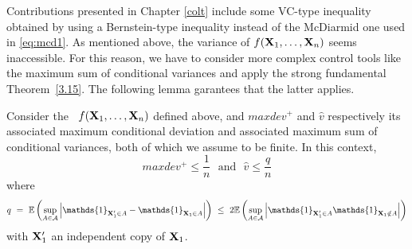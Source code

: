 Contributions presented in Chapter \ref{colt} include some VC-type inequality obtained by using a Bernstein-type inequality instead of the McDiarmid one used in \eqref{eq:mcd1}. As mentioned above, the variance of $f(\mathbf X_1,\ldots,\mathbf X_n)$ seems inaccessible. For this reason, we have to consider more complex control tools like the maximum sum of conditional variances and apply the strong fundamental Theorem~\ref{3.15}. The following lemma garantees that the latter applies.
\begin{lemma}
\label{back:lem-1}
Consider the \rv~$f(\mathbf X_1,\ldots,\mathbf X_n)$ defined above, and $maxdev^+$ and $\hat v$ respectively its associated maximum conditional deviation and associated maximum sum of conditional variances, both of which we assume to be finite. In this context,
$$maxdev^+ \le \frac{1}{n} \text{~~and~~} \hat v \le \frac{q}{n}$$ where 
\begin{align*}
q ~=~ \mathbb{E}\left ( \sup_{A \in \mathcal{A}} \left | \mathds{1}_{\mb X_1' \in A} - \mathds{1}_{\mb X_1 \in A} \right|\right) ~\le~ 2 \mathbb{E}\left ( \sup_{A \in \mathcal{A}} \left | \mathds{1}_{\mb X_1' \in A}  \mathds{1}_{\mb X_1 \notin A} \right|\right) 
\end{align*}
with $\mathbf X'_1$ an independent copy of $\mathbf X_1$.
\end{lemma}

